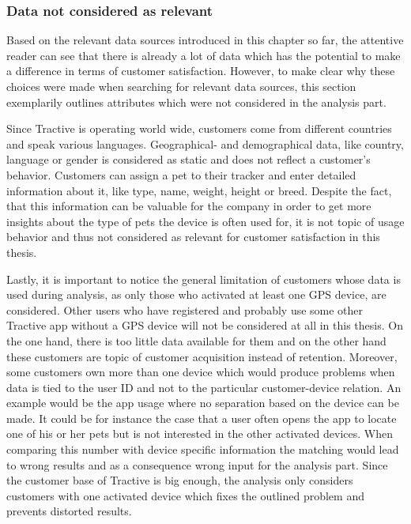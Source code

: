 \subsubsection{Data not considered as relevant}
\label{sssec:excludedData}
Based on the relevant data sources introduced in this chapter so far, the attentive reader can see that there is already a lot of data which has the potential to make a difference in terms of customer satisfaction. However, to make clear why these choices were made when searching for relevant data sources, this section exemplarily outlines attributes which were not considered in the analysis part. 

Since Tractive is operating world wide, customers come from different countries and speak various languages. Geographical- and demographical data, like country, language or gender is considered as static and does not reflect a customer's behavior. Customers can assign a pet to their tracker and enter detailed information about it, like type, name, weight, height or breed. Despite the fact, that this information can be valuable for the company in order to get more insights about the type of pets the device is often used for, it is not topic of usage behavior and thus not considered as relevant for customer satisfaction in this thesis. 

Lastly, it is important to notice the general limitation of customers whose data is used during analysis, as only those who activated at least one GPS device, are considered. Other users who have registered and probably use some other Tractive app without a GPS device will not be considered at all in this thesis. On the one hand, there is too little data available for them and on the other hand these customers are topic of customer acquisition instead of retention. Moreover, some customers own more than one device which would produce problems when data is tied to the user ID and not to the particular customer-device relation. An example would be the app usage where no separation based on the device can be made. It could be for instance the case that a user often opens the app to locate one of his or her pets but is not interested in the other activated devices. When comparing this number with device specific information the matching would lead to wrong results and as a consequence wrong input for the analysis part. Since the customer base of Tractive is big enough, the analysis only considers customers with one activated device which fixes the outlined problem and prevents distorted results. 


